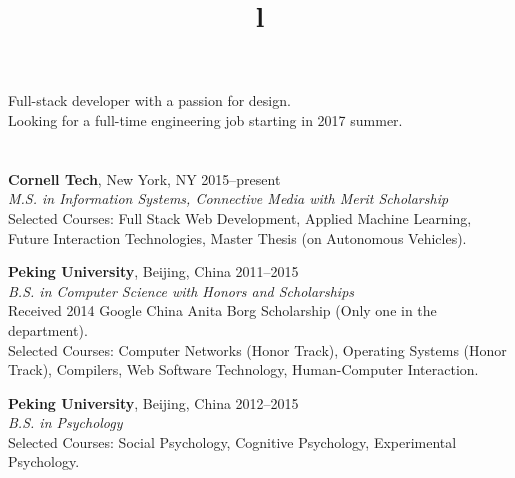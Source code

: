 \begin{resume}

\vspace{25pt}

\section{}

Full-stack developer with a passion for design. \\
Looking for a full-time engineering job starting in 2017 summer.

\section{}

\textbf{Cornell Tech}, New York, NY \hfill 2015--present \\
\textsl{M.S. in Information Systems, Connective Media with Merit Scholarship} \\
Selected Courses: Full Stack Web Development, Applied Machine Learning, Future Interaction
Technologies, Master Thesis (on Autonomous Vehicles).

\textbf{Peking University}, Beijing, China \hfill 2011--2015 \\ 
\textsl{B.S. in Computer Science with Honors and Scholarships}\\
Received 2014 Google China Anita Borg Scholarship (Only one in the department). \\
Selected Courses: Computer Networks (Honor Track), Operating Systems (Honor Track), Compilers, Web Software Technology, Human-Computer Interaction.

\textbf{Peking University}, Beijing, China \hfill 2012--2015 \\ 
\textsl{B.S. in Psychology}\\
Selected Courses: Social Psychology, Cognitive Psychology, Experimental Psychology.

\begin{formatb}
  \\
  \title{l}\\
  \body\\
\end{formatb}


\section{}


\end{resume}
